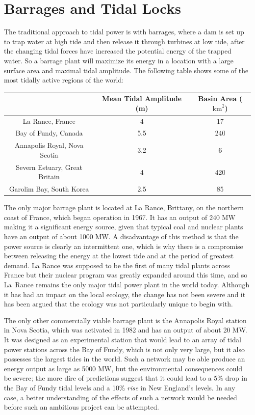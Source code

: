 \documentclass[11pt]{article}
\begin{document}

\section{Barrages and Tidal Locks}
\label{BarragesLocks}

The traditional approach to tidal power is with barrages, where a dam is set up to trap water at high tide and then release it through turbines at low tide, after the changing tidal forces have increased the potential energy of the trapped water. So a barrage plant will maximize its energy in a location with a large surface area and maximal tidal amplitude. The following table shows some of the most tidally active regions of the world:
\begin{center}
\begin{tabular}{|c|c|c|}
\hline
& Mean Tidal Amplitude (m) & Basin Area ($\textrm{km}^2$) \\
\hline
La Rance, France & 4 & 17 \\
\hline
Bay of Fundy, Canada & 5.5 & 240 \\
\hline
Annapolis Royal, Nova Scotia & 3.2 & 6 \\
\hline
Severn Estuary, Great Britain & 4 & 420 \\
\hline
Garolim Bay, South Korea & 2.5 & 85 \\
\hline
\end{tabular}
\end{center}

The only major barrage plant is located at La Rance, Brittany, on the northern coast of France, which began operation in 1967. It has an output of 240 MW making it a significant energy source, given that typical coal and nuclear plants have an output of about 1000 MW. A disadvantage of this method is that the power source is clearly an intermittent one, which is why there is a compromise between releasing the energy at the lowest tide and at the period of greatest demand. La Rance was supposed to be the first of many tidal plants across France but their nuclear program was greatly expanded around this time, and so La~Rance remains the only major tidal power plant in the world today. Although it has had an impact on the local ecology, the change has not been severe and it has been argued that the ecology was not particularly unique to begin with.

The only other commercially viable barrage plant is the Annapolis Royal station in Nova Scotia, which was activated in 1982 and has an output of about 20 MW. It was designed as an experimental station that would lead to an array of tidal power stations across the Bay of Fundy, which is not only very large, but it also possesses the largest tides in the world. Such a network may be able produce an energy output as large as 5000 MW, but the environmental consequences could be severe; the more dire of predictions suggest that it could lead to a 5\% drop in the Bay of Fundy tidal levels and a 10\% \emph{rise} in New England's levels. In any case, a better understanding of the effects of such a network would be needed before such an ambitious project can be attempted.
\end{document}
